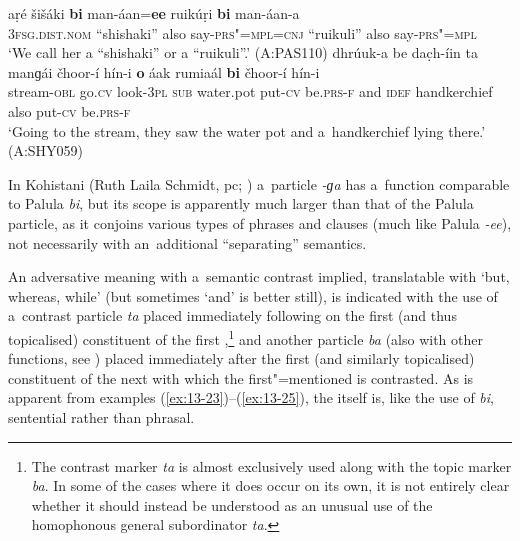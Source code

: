 \ea
\label{ex:13-21}
\gll aṛé {\ob}šišáki \textbf{bi} man-áan=\textbf{ee} ruikúṛi \textbf{bi} man-áan-a{\cb}\\
\textsc{3fsg.dist.nom} ``shishaki'' also say-\textsc{prs"=mpl=cnj}  ``ruikuli'' also say-\textsc{prs"=mpl}\\
\glt `We call her a ``shishaki'' or a ``ruikuli''.' (A:PAS110)
\ex
\label{ex:13-22}
\gll dhrúuk-a be dac̣h-íin ta {\ob}manɡái čhoor-í hín-i \textbf{o} áak rumiaál \textbf{bi} čhoor-í hín-i{\cb}\\
stream-\textsc{obl} go.\textsc{cv} look-\textsc{3pl} \textsc{sub} water.pot put-\textsc{cv}  be.\textsc{prs-f} and \textsc{idef } handkerchief also put-\textsc{cv} be.\textsc{prs-f } \\
\glt `Going to the stream, they saw the water pot and a~handkerchief lying there.' (A:SHY059) 
\z

In Kohistani \iliShina (Ruth Laila Schmidt, pc; \citealt[252]{schmidtkohistani2008}) a~particle \textit{-ɡa} has a~function comparable to Palula \textit{bi}, but its scope is apparently much larger than that of the Palula particle, as it conjoins various types of phrases and clauses (much like Palula \textit{-ee}), not necessarily with an~additional ``separating'' semantics. 


 An adversative meaning with a~semantic contrast implied, translatable with `but, whereas, while' (but sometimes `and' is better still), is indicated with the use of a~contrast particle \textit{ta} placed immediately following on the first (and thus topicalised) constituent of the first ,\footnote{The contrast marker \textit{ta} is almost exclusively used along with the topic marker \textit{ba}. In some of the cases where it does occur on its own, it is not entirely clear whether it should instead be understood as an unusual use of the homophonous general subordinator \textit{ta}.} and another particle \textit{ba} (also with other  functions, see ) placed immediately after the first (and similarly topicalised) constituent of the next  with which the first"=mentioned is contrasted. As is apparent from examples (\ref{ex:13-23})--(\ref{ex:13-25}), the  itself is, like the use of \textit{bi}, sentential rather than phrasal.


